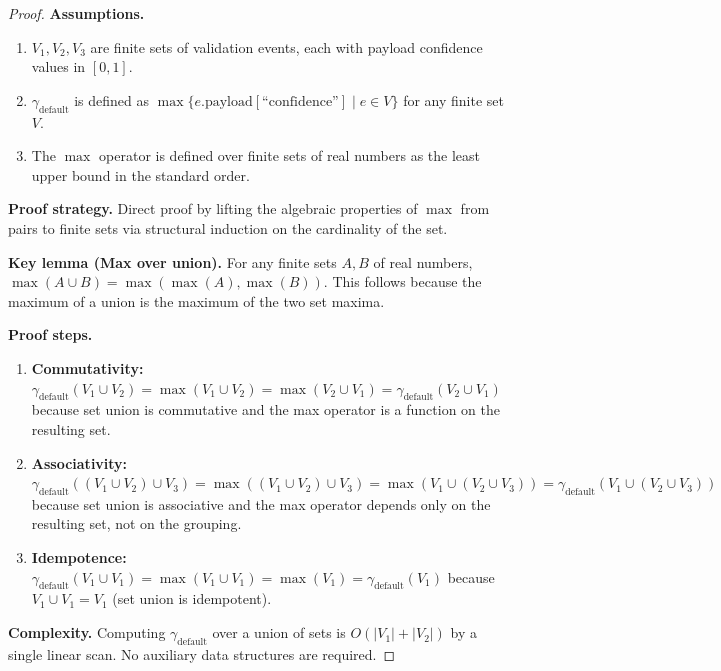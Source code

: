 \begin{proof}
\textbf{Assumptions.}
\begin{enumerate}[label=(A\arabic*),leftmargin=2em]
    \item $V_1, V_2, V_3$ are finite sets of validation events, each with payload confidence values in $[0, 1]$.
    \item $\gamma_{\text{default}}$ is defined as $\max\{e.\text{payload}[\text{``confidence''}] \mid e \in V\}$ for any finite set $V$.
    \item The $\max$ operator is defined over finite sets of real numbers as the least upper bound in the standard order.
\end{enumerate}

\textbf{Proof strategy.} Direct proof by lifting the algebraic properties of $\max$ from pairs to finite sets via structural induction on the cardinality of the set.

\textbf{Key lemma (Max over union).} For any finite sets $A, B$ of real numbers, $\max(A \cup B) = \max(\max(A), \max(B))$. This follows because the maximum of a union is the maximum of the two set maxima.

\textbf{Proof steps.}
\begin{enumerate}[label=Step~\arabic*:,leftmargin=2em]
    \item \textbf{Commutativity:} $\gamma_{\text{default}}(V_1 \cup V_2) = \max(V_1 \cup V_2) = \max(V_2 \cup V_1) = \gamma_{\text{default}}(V_2 \cup V_1)$ because set union is commutative and the max operator is a function on the resulting set.
    \item \textbf{Associativity:} $\gamma_{\text{default}}((V_1 \cup V_2) \cup V_3) = \max((V_1 \cup V_2) \cup V_3) = \max(V_1 \cup (V_2 \cup V_3)) = \gamma_{\text{default}}(V_1 \cup (V_2 \cup V_3))$ because set union is associative and the max operator depends only on the resulting set, not on the grouping.
    \item \textbf{Idempotence:} $\gamma_{\text{default}}(V_1 \cup V_1) = \max(V_1 \cup V_1) = \max(V_1) = \gamma_{\text{default}}(V_1)$ because $V_1 \cup V_1 = V_1$ (set union is idempotent).
\end{enumerate}

\textbf{Complexity.} Computing $\gamma_{\text{default}}$ over a union of sets is $O(|V_1| + |V_2|)$ by a single linear scan. No auxiliary data structures are required.
\end{proof}

